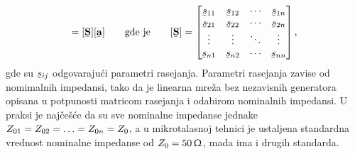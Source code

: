 \documentclass[a4paper, 12pt, diplomski]{etf}
\newcommand{\unit}[1]{\,{\rm #1}}
\newcommand{\faz}[1]{\underaccent{\bar}{#1}}
\begin{document}
\begin{equation}
[\faz{\bf b}] = [\faz{\bf S}] [\faz{\bf a}] 
\quad \quad \text{gde je} \quad \quad
[\faz {\bf S}]
=
\begin{bmatrix}
\faz s_{11} & \faz s_{12} & \cdots & \faz s_{1n}\\ 
\faz s_{21} & \faz s_{22} & \cdots & \faz s_{2n} \\
\vdots & \vdots & \ddots & \vdots \\ 
\faz s_{n1} & \faz s_{n2} & \cdots & \faz s_{nn}
\end{bmatrix}, 
    \label{eq:spar}
\end{equation}
%
gde su $\faz s_{ij}$ odgovarajući parametri rasejanja.
Parametri rasejanja zavise od nomimalnih impedansi,
tako da je linearna mreža bez nezavisnih
generatora opisana u potpunosti 
matricom rasejanja i odabirom nominalnih 
impedansi. U praksi je najčešće da su sve 
nominalne impedanse jednake  $Z_{\rm 01} = Z_{\rm 02} = \ldots = Z_{0n} = Z_0$, a u mikrotalasnoj tehnici je 
ustaljena standardna vrednost nominalne impedanse 
od $Z_0 = 50\unit{\Upomega}$, mada ima i drugih standarda.
\end{document}
